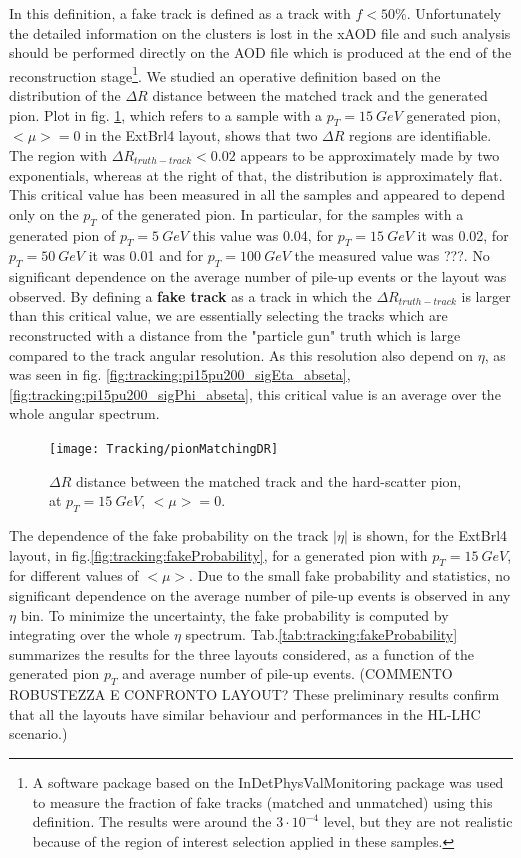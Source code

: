 \documentclass[a4paper,twoside,12pt]{article}
\begin{document}
In this definition, a fake track is defined as a track with $f < 50\%$. Unfortunately the detailed information on the clusters is lost in the xAOD file and such analysis should be performed directly on the AOD file
which is produced at the end of the reconstruction stage\footnote{A software package based on the InDetPhysValMonitoring package was used to measure the fraction of fake tracks (matched and unmatched) using this definition. The results were around the $3\cdot 10^{-4}$ level, but they are not realistic because of the region of interest selection applied in these samples.}. We studied an operative definition based on the distribution of the $\Delta R$ distance between the matched track and
the generated pion. Plot in fig. \ref{fig:tracking:pionMatchingDR}, which refers to a sample with a $p_{T} = 15\ GeV$ generated pion, $<\mu> = 0$ in the ExtBrl4 layout, shows 
that two $\Delta R$ regions are identifiable. The region with $\Delta R_{truth-track} < 0.02$ appears to be approximately made by two exponentials, whereas at the right of that, the distribution is approximately flat. This critical value has been measured in all the samples and appeared to depend only on the $p_{T}$ of the generated pion. In particular, for the samples with a generated pion of $p_{T} = 5\ GeV$ this value was 0.04, for $p_{T} = 15\ GeV$ it was 0.02, for $p_{T} = 50\ GeV$ it was 0.01 and for $p_{T} = 100\ GeV$ the measured value was ???. No significant dependence on the average number of pile-up events or the layout was observed. By defining
a \textbf{fake track} as a track in which the $\Delta R_{truth-track}$ is larger than this critical value, we are essentially selecting the tracks
which are reconstructed with a distance from the "particle gun" truth which is large compared to the track angular resolution. As this resolution also depend on $\eta$, as was seen in fig.
\ref{fig:tracking:pi15pu200_sigEta_abseta}, \ref{fig:tracking:pi15pu200_sigPhi_abseta}, this critical value is an average over the whole angular spectrum.\\

\begin{figure}
\centering
\texttt{[image: Tracking/pionMatchingDR]}
\caption{$\Delta R$ distance between the matched track and the hard-scatter pion, at $p_{T} = 15\ GeV$, $<\mu> = 0$.} 
\label{fig:tracking:pionMatchingDR}
\end{figure}

The dependence of the fake probability on the track $|\eta|$ is shown, for the ExtBrl4 layout, in fig.\ref{fig:tracking:fakeProbability}, for a generated pion with $p_{T} = 15\ GeV$, for 
different values of $<\mu>$. Due to the small fake probability and statistics, no significant dependence on the average number of pile-up events is observed in any $\eta$ bin. To minimize
the uncertainty, the fake probability is computed by integrating over the whole $\eta$ spectrum. Tab.\ref{tab:tracking:fakeProbability} summarizes the results for the three layouts considered, as a function of the generated pion $p_{T}$ and average number of pile-up events. (COMMENTO ROBUSTEZZA E CONFRONTO LAYOUT? These preliminary results confirm that
all the layouts have similar behaviour and performances in the HL-LHC scenario.)\\ 
\end{document}
